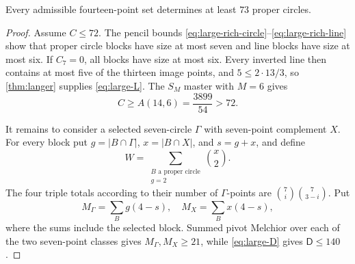 \begin{proposition}
\label{prop:n14-dichotomy}
Every admissible fourteen-point set determines at least $73$ proper
circles.
\end{proposition}

\begin{proof}
Assume $C\leq72$.  The pencil bounds
\eqref{eq:large-rich-circle}--\eqref{eq:large-rich-line} show that proper
circle blocks have size at most seven and line blocks have size at most
six.  If $C_7=0$, all blocks have size at most six.  Every inverted line
then contains at most five of the thirteen image points, and
$5\leq2\cdot13/3$, so \cref{thm:langer} supplies \eqref{eq:large-L}.
The $S_M$ master with $M=6$ gives
\[
 C\geq A(14,6)=\frac{3899}{54}>72.
\]

It remains to consider a selected seven-circle $\Gamma$ with seven-point
complement $X$.  For every block put
$g=|B\cap\Gamma|$, $x=|B\cap X|$, and $s=g+x$, and define
\begin{equation}
 W=\sum_{\substack{B\text{ a proper circle}\\g=2}}\binom x2.
                                                               \label{eq:n14-W}
\end{equation}
The four triple totals according to their number of $\Gamma$-points are
$\binom7i\binom7{3-i}$.  Put
\[
 M_\Gamma=\sum_B g(4-s),\quad M_X=\sum_B x(4-s),
\]
where the sums include the selected block.  Summed pivot Melchior over each
of the two seven-point classes gives $M_\Gamma,M_X\geq21$, while
\eqref{eq:large-D} gives $\mathsf D\leq140$.


\end{proof}
